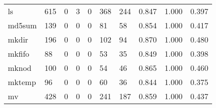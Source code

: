 \begin{longtable}{lp{2.0cm}p{2.0cm}p{2.0cm}p{2.0cm}p{2.0cm}p{2.0cm}p{2.0cm}p{2.0cm}p{2.0cm}}
ls        &                    615 &                                             0 &                                            3 &                                           0 &                                          368 &                                        244 &                                0.847 &                                  1.000 &                                0.397 \\
md5sum    &                    139 &                                             0 &                                            0 &                                           0 &                                           81 &                                         58 &                                0.854 &                                  1.000 &                                0.417 \\
mkdir     &                    196 &                                             0 &                                            0 &                                           0 &                                          102 &                                         94 &                                0.870 &                                  1.000 &                                0.480 \\
mkfifo    &                     88 &                                             0 &                                            0 &                                           0 &                                           53 &                                         35 &                                0.849 &                                  1.000 &                                0.398 \\
mknod     &                    100 &                                             0 &                                            0 &                                           0 &                                           54 &                                         46 &                                0.865 &                                  1.000 &                                0.460 \\
mktemp    &                     96 &                                             0 &                                            0 &                                           0 &                                           60 &                                         36 &                                0.844 &                                  1.000 &                                0.375 \\
mv        &                    428 &                                             0 &                                            0 &                                           0 &                                          241 &                                        187 &                                0.859 &                                  1.000 &                                0.437 \\

\end{longtable}
